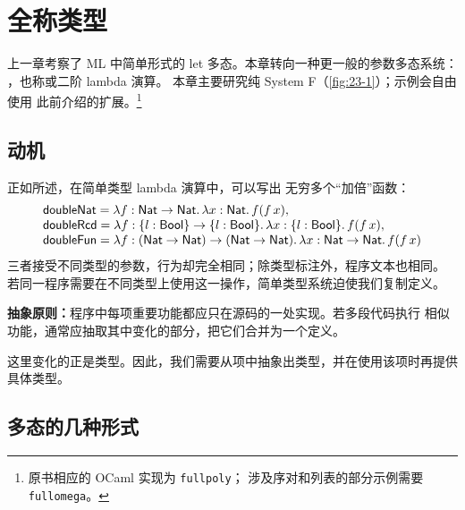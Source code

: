 
\chapter{全称类型}
\label{chap:23}

上一章考察了 ML 中简单形式的 let 多态。本章转向一种更一般的参数多态系统：
，也称或二阶 lambda 演算。
本章主要研究纯 System F（\cref{fig:23-1}）；示例会自由使用
此前介绍的扩展。\footnote{原书相应的 OCaml 实现为 \texttt{fullpoly}；
涉及序对和列表的部分示例需要 \texttt{fullomega}。}

\section{动机}
\label{sec:23.1}

正如所述，在简单类型 lambda 演算中，可以写出
无穷多个“加倍”函数：
\[
\begin{array}{l}
\mathsf{doubleNat}
 =\lambda f:\mathsf{Nat}\to\mathsf{Nat}.\,
   \lambda x:\mathsf{Nat}.\,f(f\,x),\\
\mathsf{doubleRcd}
 =\lambda f:\{l:\mathsf{Bool}\}\to\{l:\mathsf{Bool}\}.\,
   \lambda x:\{l:\mathsf{Bool}\}.\,f(f\,x),\\
\mathsf{doubleFun}
 =\lambda f:(\mathsf{Nat}\to\mathsf{Nat})\to
              (\mathsf{Nat}\to\mathsf{Nat}).\,
   \lambda x:\mathsf{Nat}\to\mathsf{Nat}.\,f(f\,x)
\end{array}
\]
三者接受不同类型的参数，行为却完全相同；除类型标注外，程序文本也相同。
若同一程序需要在不同类型上使用这一操作，简单类型系统迫使我们复制定义。

\begin{keystatement}
\textbf{抽象原则：}程序中每项重要功能都应只在源码的一处实现。若多段代码执行
相似功能，通常应抽取其中变化的部分，把它们合并为一个定义。
\end{keystatement}

这里变化的正是类型。因此，我们需要从项中抽象出类型，并在使用该项时再提供
具体类型。

\section{多态的几种形式}
\label{sec:23.2}

